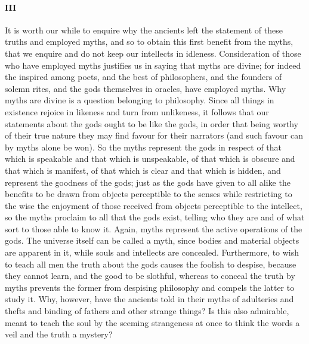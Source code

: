 \documentclass[12pt]{article}
\begin{document}
\paragraph{III} It is worth our while to enquire why the ancients left the
statement of these truths and employed myths, and so to
obtain this first benefit from the myths, that we enquire and
do not keep our intellects in idleness. Consideration of those
who have employed myths justifies us in saying that myths
are divine; for indeed the inspired among poets, and the
best of philosophers, and the founders of solemn rites, and
the gods themselves in oracles, have employed myths. Why
myths are divine is a question belonging to philosophy.
Since all things in existence rejoice in likeness and turn
from unlikeness, it follows that our statements about the
gods ought to be like the gods, in order that being worthy
of their true nature they may find favour for their narrators
(and such favour can by myths alone be won). So the myths
represent the gods in respect of that which is speakable and
that which is unspeakable, of that which is obscure and that
which is manifest, of that which is clear and that which is
hidden, and represent the goodness of the gods; just as the
gods have given to all alike the benefits to be drawn from
objects perceptible to the senses while restricting to the wise
the enjoyment of those received from objects perceptible to
the intellect, so the myths proclaim to all that the gods
exist, telling who they are and of what sort to those able to
know it. Again, myths represent the active operations of
the gods. The universe itself can be called a myth, since
bodies and material objects are apparent in it, while souls
and intellects are concealed. Furthermore, to wish to teach
all men the truth about the gods causes the foolish to
despise, because they cannot learn, and the good to be
slothful, whereas to conceal the truth by myths prevents
the former from despising philosophy and compels the latter
to study it. Why, however, have the ancients told in their
myths of adulteries and thefts and binding of fathers and
other strange things? Is this also admirable, meant to teach
the soul by the seeming strangeness at once to think the
words a veil and the truth a mystery?
\end{document}
